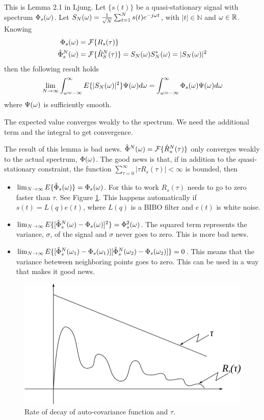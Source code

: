 \documentclass[lecture,12pt,]{pcms-l}
\begin{document}
\begin{lemma}
This is Lemma 2.1 in Ljung. Let $\{s(t)\}$ be a quasi-stationary signal with spectrum $\Phi_s(\omega)$. Let $S_N(\omega) = \frac{1}{\sqrt{N}} \sum_{t=1}^N s(t)e^{-j\omega t}$, with $|t|\in\mathbb{N}$ and $\omega\in\mathbb{R}$. Knowing
\begin{align*}
\Phi_s(\omega) &= \mathcal{F}\{R_s(\tau)\} \\
\hat{\Phi}_s^N(\omega) &= \mathcal{F}\{\hat{R}_S^N(\tau)\} = S_N(\omega)S_N^*(\omega) = |S_N(\omega)|^2
\end{align*}
then the following result holds
$$\lim_{N\to\infty} \int_{\omega=-\infty}^\infty E\{|S_N(\omega)|^2\}\Psi(\omega)d\omega = \int_{\omega=-\infty}^\infty \Phi_s(\omega)\Psi(\omega)d\omega$$
where $\Psi(\omega)$ is sufficiently smooth.
\end{lemma}
The expected value converges weakly to the spectrum. We need the additional term and the integral to get convergence.

The result of this lemma is bad news. $\hat{\Phi}^N(\omega) = \mathcal{F}\{\hat{R}_u^N(\tau)\}$ only converges weakly to the actual spectrum, $\Phi(\omega)$. The good news is that, if in addition to the quasi-stationary constraint, the function $\sum_{\tau=0}^\infty|\tau R_s(\tau)|<\infty$ is bounded, then
\begin{itemize}
\item $\lim_{N\to\infty}E\{\hat{\Phi}_s(\omega)\} = \Phi_s(\omega)$. For this to work $R_s(\tau)$ needs to go to zero faster than $\tau$. See Figure \ref{fig:06autoCovDecay}. This happens automatically if $s(t)=L(q)e(t)$, where $L(q)$ is a BIBO filter and $e(t)$ is white noise.
\item $\lim_{N\to\infty}E\{[\hat{\Phi}_s^N(\omega)-\Phi_s(\omega)]^2\} = \Phi_s^2(\omega)$. The squared term represents the variance, $\sigma$, of the signal and $\sigma$ never goes to zero. This is more bad news.
\item $\lim_{N\to\infty}E\{[\hat{\Phi}_s^N(\omega_1)-\Phi_s(\omega_1)][\hat{\Phi}_s^N(\omega_2)-\Phi_s(\omega_2)]\} = 0$. This means that the variance beteween neighboring points goes to zero. This can be used in a way that makes it good news.
\end{itemize}

\begin{figure}[ht!]
	\centering
	\includegraphics[width=.4\textwidth]{images/06autoCovDecay}
	\caption{Rate of decay of auto-covariance function and $\tau$.}
	\label{fig:06autoCovDecay}
\end{figure}
\end{document}
